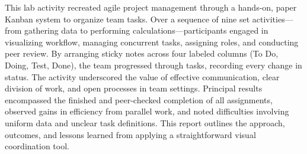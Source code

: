 This lab activity recreated agile project management through a hands-on, paper Kanban
system to organize team tasks. Over a sequence of nine set activities—from gathering
data to performing calculations—participants engaged in visualizing workflow, managing concurrent tasks, assigning roles, and conducting peer review. By arranging sticky
notes across four labeled columns (To Do, Doing, Test, Done), the team progressed
through tasks, recording every change in status. The activity underscored the value of
effective communication, clear division of work, and open processes in team settings.
Principal results encompassed the finished and peer-checked completion of all assignments, observed gains in efficiency from parallel work, and noted difficulties involving
uniform data and unclear task definitions. This report outlines the approach, outcomes,
and lessons learned from applying a straightforward visual coordination tool.

\endinput
